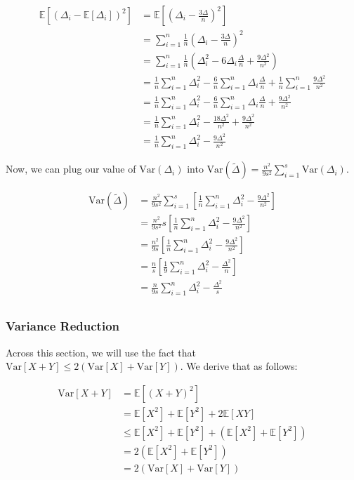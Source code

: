 \documentclass[11pt]{article}
\begin{document}
\[
\begin{aligned}
\mathbb{E}[(\Delta_i - \mathbb{E}[\Delta_i])^2] &= \mathbb{E}[(\Delta_i - \frac{3\Delta}{n})^2] \\
&= \sum_{i = 1}^{n} \frac{1}{n} (\Delta_i - \frac{3\Delta}{n})^2 \\
&= \sum_{i = 1}^{n} \frac{1}{n} (\Delta_i^2 - 6 \Delta_i \frac{\Delta}{n} + \frac{9\Delta^2}{n^2}) \\
&= \frac{1}{n} \sum_{i = 1}^{n} \Delta_i^2 - \frac{6}{n} \sum_{i = 1}^{n} \Delta_i \frac{\Delta}{n} + \frac{1}{n} \sum_{i = 1}^{n} \frac{9\Delta^2}{n^2} \\
&= \frac{1}{n} \sum_{i = 1}^{n} \Delta_i^2 - \frac{6}{n} \sum_{i = 1}^{n} \Delta_i \frac{\Delta}{n} + \frac{9\Delta^2}{n^2} \\
&= \frac{1}{n} \sum_{i = 1}^{n} \Delta_i^2 - \frac{18\Delta^2}{n^2} + \frac{9\Delta^2}{n^2} \\
&= \frac{1}{n} \sum_{i = 1}^{n} \Delta_i^2 - \frac{9\Delta^2}{n^2}
\end{aligned}
\]

Now, we can plug our value of $\mathrm{Var}(\Delta_i)$ into $\mathrm{Var}(\tilde{\Delta}) = \frac{n^2}{9s^2} \sum_{i=1}^{s} \mathrm{Var}(\Delta_i)$.

\[
\begin{aligned}
\mathrm{Var}(\tilde{\Delta}) &= \frac{n^2}{9s^2} \sum_{i=1}^{s} [\frac{1}{n} \sum_{i = 1}^{n} \Delta_i^2 - \frac{9\Delta^2}{n^2}] \\
&= \frac{n^2}{9s^2} s [\frac{1}{n} \sum_{i = 1}^{n} \Delta_i^2 - \frac{9\Delta^2}{n^2}] \\
&= \frac{n^2}{9s} [\frac{1}{n} \sum_{i = 1}^{n} \Delta_i^2 - \frac{9\Delta^2}{n^2}] \\
&= \frac{n}{s} [\frac{1}{9}\sum_{i = 1}^{n} \Delta_i^2 - \frac{\Delta^2}{n}] \\
&= \frac{n}{9s} \sum_{i = 1}^{n} \Delta_i^2 - \frac{\Delta^2}{s} \\
\end{aligned}
\]

\subsubsection{Variance Reduction}

Across this section, we will use the fact that $\mathrm{Var}[X+Y] \leq 2(\mathrm{Var}[X] + \mathrm{Var}[Y])$. We derive that as follows:

\[
\begin{aligned}
    \mathrm{Var}[X+Y] &= \mathbb{E}[(X+Y)^2] \\
    &= \mathbb{E}[X^2] + \mathbb{E}[Y^2] + 2\mathbb{E}[XY] \\
    &\leq \mathbb{E}[X^2] + \mathbb{E}[Y^2] + (\mathbb{E}[X^2] + \mathbb{E}[Y^2]) \\
    &= 2(\mathbb{E}[X^2] + \mathbb{E}[Y^2]) \\
    &= 2(\mathrm{Var}[X] + \mathrm{Var}[Y])
\end{aligned}
\]
\end{document}

